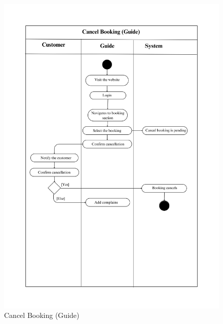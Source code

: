 \begin{figure}[h!]
    \centering
    \includegraphics[width=1\textwidth]{Images/Activity Diagrams/25 Cancel Booking (Guide).png}
    \caption{Cancel Booking (Guide)}
    \label{fig:activity-cancel-guide}
\end{figure}


